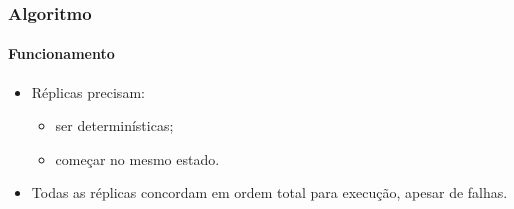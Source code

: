 \documentclass{beamer}
\begin{document}
\begin{frame}
  \frametitle{Algoritmo}
  \framesubtitle{Funcionamento}

  \begin{itemize}
    \item
      Réplicas precisam:
      \begin{itemize}
        \item
          ser determinísticas;

        \item
          começar no mesmo estado.
      \end{itemize}

    \item
      Todas as réplicas concordam em ordem total para execução, apesar de falhas.
  \end{itemize}
\end{frame}
\end{document}
